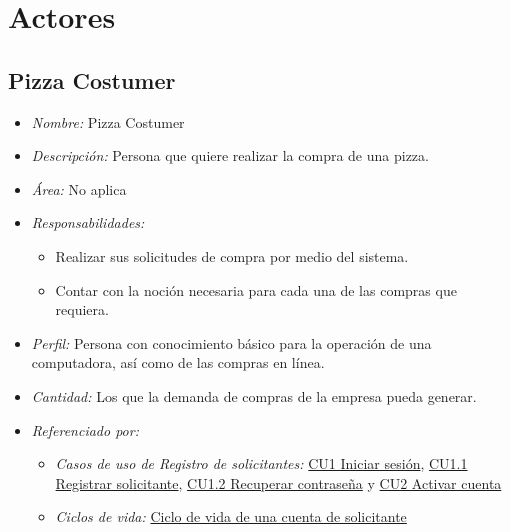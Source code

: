 
\pagebreak
\section{Actores}

	\hypertarget{A:Pizza Costumer}{}
	\subsection{Pizza Costumer}

		\begin{itemize}
			
			\item \textit{Nombre:} Pizza Costumer %
			
			\item \textit{Descripción:} Persona que quiere realizar la compra de una pizza.
			
			\item \textit{Área:} No aplica
			
			\item \textit{Responsabilidades:}

				\begin{itemize}
					\item Realizar sus solicitudes de compra por medio del sistema.
					\item Contar con la noción necesaria para cada una de las compras que requiera.
				\end{itemize}

			\item \textit{Perfil:} Persona con conocimiento básico para la operación de una computadora, así como de las compras en línea.
			
			\item \textit{Cantidad:} Los que la demanda de compras de la empresa pueda generar.

			\item \textit{Referenciado por:} 
		

				\begin{itemize}
					
					\item \textit{Casos de uso de Registro de solicitantes:} \hyperlink{CU1}{CU1 Iniciar sesión}, \hyperlink{CU1.1}{CU1.1 Registrar solicitante}, \hyperlink{CU1.2}{CU1.2 Recuperar contraseña} y \hyperlink{CU2}{CU2 Activar cuenta}

					\item \textit{Ciclos de vida:} \hyperlink{CV:CuentaSolicitante}{Ciclo de vida de una cuenta de solicitante}

				\end{itemize}

		\end{itemize}

